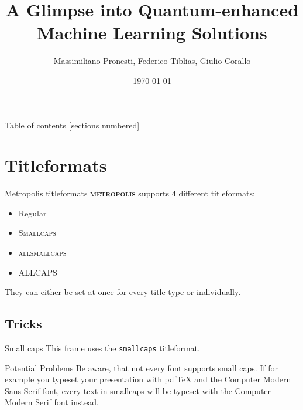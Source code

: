 \documentclass[10pt]{beamer}
\title{A Glimpse into Quantum-enhanced Machine Learning Solutions}
\date{\today}
\author{
	Massimiliano Pronesti, 
	Federico Tiblias, 
	Giulio Corallo
}
\institute{Amadeus Knowledge Sharing Session}
\newcommand{\themename}{\textbf{\textsc{metropolis}}\xspace}
\begin{document}
	
	\maketitle
	
	
	
	\begin{frame}{Table of contents}
		[sections numbered]
		\tableofcontents
	\end{frame}
	
	
    
    
	
	\section{Titleformats}
	
	\begin{frame}{Metropolis titleformats}
		\themename supports 4 different titleformats:
		\begin{itemize}
			\item Regular
			\item \textsc{Smallcaps}
			\item \textsc{allsmallcaps}
			\item ALLCAPS
		\end{itemize}
		They can either be set at once for every title type or individually.
	\end{frame}
	
	\subsection{Tricks}
	
	{
		\begin{frame}{Small caps}
			This frame uses the \texttt{smallcaps} titleformat.
			
			\begin{alertblock}{Potential Problems}
				Be aware, that not every font supports small caps. If for example you typeset your presentation with pdfTeX and the Computer Modern Sans Serif font, every text in smallcaps will be typeset with the Computer Modern Serif font instead.
			\end{alertblock}
		\end{frame}
	}
	
\end{document}
